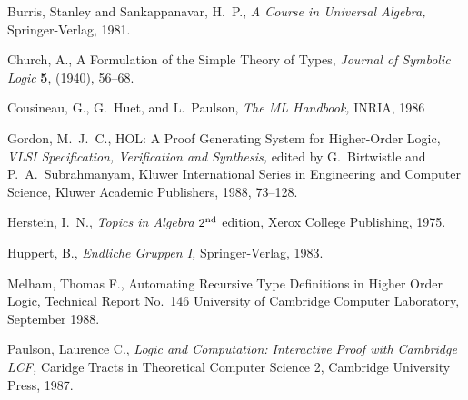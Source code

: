 
\begin{thebibliography}{99}

 Burris, Stanley and Sankappanavar, H.~P.,
{\it A Course in Universal Algebra,}
Springer-Verlag, 1981.

 Church, A.,
A Formulation of the Simple Theory of Types,
{\it Journal of Symbolic Logic} {\bf 5}, (1940), 56--68.

 Cousineau, G., G.~Huet, and L.~Paulson,
{\it The ML Handbook,}
INRIA, 1986

 Gordon, M.~J.~C.,
HOL: A Proof Generating System for Higher-Order Logic,
{\it VLSI Specification, Verification and Synthesis,}
edited by G.~Birtwistle and P.~A.~Subrahmanyam,
Kluwer International Series in Engineering and Computer Science,
Kluwer Academic Publishers, 1988, 73--128.

 Herstein, I.~N.,
{\it Topics in Algebra\/} $2^{\rm nd}$ edition,
Xerox College Publishing, 1975.

 Huppert, B.,
{\it Endliche Gruppen I,}
Springer-Verlag, 1983.

 Melham, Thomas F.,
Automating Recursive Type Definitions in Higher Order Logic,
Technical Report No.~146
University of Cambridge Computer Laboratory,
September 1988.

 Paulson, Laurence C.,
{\it Logic and Computation: Interactive Proof with Cambridge LCF,}
Caridge Tracts in Theoretical Computer Science 2,
Cambridge University Press, 1987.

\end{thebibliography}
